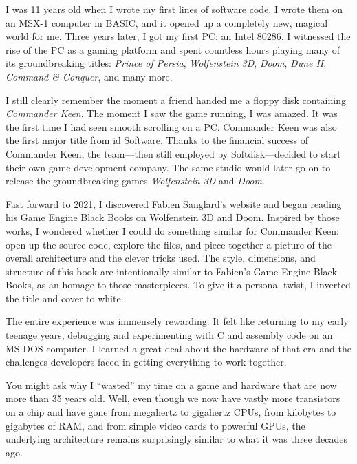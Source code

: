 \documentclass[book.tex]{subfiles}
\begin{document}
I was 11 years old when I wrote my first lines of software code. I wrote them on an MSX-1 computer in BASIC, and it opened up a completely new, magical world for me. Three years later, I got my first PC: an Intel 80286. I witnessed the rise of the PC as a gaming platform and spent countless hours playing many of its groundbreaking titles: \textit{Prince of Persia}, \textit{Wolfenstein 3D}, \textit{Doom}, \textit{Dune II}, \textit{Command \& Conquer}, and many more.\\

\par
I still clearly remember the moment a friend handed me a floppy disk containing \textit{Commander Keen}. The moment I saw the game running, I was amazed. It was the first time I had seen smooth scrolling on a PC. Commander Keen was also the first major title from id Software. Thanks to the financial success of Commander Keen, the team---then still employed by Softdisk---decided to start their own game development company. The same studio would later go on to release the groundbreaking games \textit{Wolfenstein 3D} and \textit{Doom}.\\

\par
Fast forward to 2021, I discovered Fabien Sanglard’s website and began reading his Game Engine Black Books on Wolfenstein 3D and Doom. Inspired by those works, I wondered whether I could do something similar for Commander Keen: open up the source code, explore the files, and piece together a picture of the overall architecture and the clever tricks used. The style, dimensions, and structure of this book are intentionally similar to Fabien’s Game Engine Black Books, as an homage to those masterpieces. To give it a personal twist, I inverted the title and cover to white.\\

\par
The entire experience was immensely rewarding. It felt like returning to my early teenage years, debugging and experimenting with C and assembly code on an MS-DOS computer. I learned a great deal about the hardware of that era and the challenges developers faced in getting everything to work together.\\

\par
You might ask why I “wasted” my time on a game and hardware that are now more than 35 years old. Well, even though we now have vastly more transistors on a chip and have gone from megahertz to gigahertz CPUs, from kilobytes to gigabytes of RAM, and from simple video cards to powerful GPUs, the underlying architecture remains surprisingly similar to what it was three decades ago.\\
\end{document}
